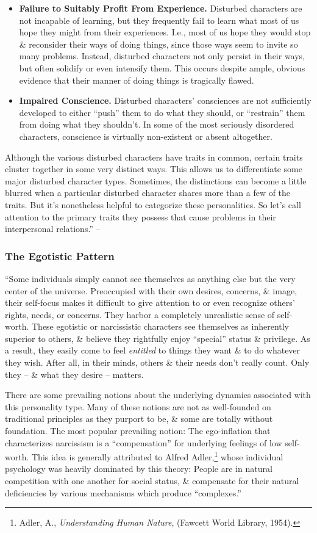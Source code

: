 \documentclass{article}
\numberwithin{equation}{section}
\begin{document}
\begin{itemize}
	\item \textbf{Failure to Suitably Profit From Experience.} Disturbed characters are not incapable of learning, but they frequently fail to learn what most of us hope they might from their experiences. I.e., most of us hope they would stop \& reconsider their ways of doing things, since those ways seem to invite so many problems. Instead, disturbed characters not only persist in their ways, but often solidify or even intensify them. This occurs despite ample, obvious evidence that their manner of doing things is tragically flawed.
	\item \textbf{Impaired Conscience.} Disturbed characters' consciences are not sufficiently developed to either ``push'' them to do what they should, or ``restrain'' them from doing what they shouldn't. In some of the most seriously disordered characters, conscience is virtually non-existent or absent altogether.
\end{itemize}
Although the various disturbed characters have traits in common, certain traits cluster together in some very distinct ways. This allows us to differentiate some major disturbed character types. Sometimes, the distinctions can become a little blurred when a particular disturbed character shares more than a few of the traits. But it's nonetheless helpful to categorize these personalities. So let's call attention to the primary traits they possess that cause problems in their interpersonal relations.'' -- \cite[pp. 70--77]{Simon2011}

\subsubsection{The Egotistic Pattern}
``Some individuals simply cannot see themselves as anything else but the very center of the universe. Preoccupied with their own desires, concerns, \& image, their self-focus makes it difficult to give attention to or even recognize others' rights, needs, or concerns. They harbor a completely unrealistic sense of self-worth. These egotistic or narcissistic characters see themselves as inherently superior to others, \& believe they rightfully enjoy ``special'' status \& privilege. As a result, they easily come to feel \textit{entitled} to things they want \& to do whatever they wish. After all, in their minds, others \& their needs don't really count. Only they -- \& what they desire -- matters.

There are some prevailing notions about the underlying dynamics associated with this personality type. Many of these notions are not as well-founded on traditional principles as they purport to be, \& some are totally without foundation. The most popular prevailing notion: The ego-inflation that characterizes narcissism is a ``compensation'' for underlying feelings of low self-worth. This idea is generally attributed to Alfred Adler,\footnote{Adler, A., \textit{Understanding Human Nature}, (Fawcett World Library, 1954).} whose individual psychology was heavily dominated by this theory: People are in natural competition with one another for social status, \& compensate for their natural deficiencies by various mechanisms which produce ``complexes.''
\end{document}

